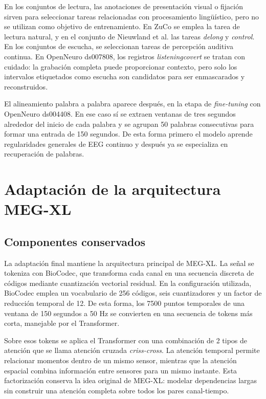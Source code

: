 En los conjuntos de lectura, las anotaciones de presentación visual o fijación sirven para seleccionar tareas relacionadas con procesamiento lingüístico, pero no se utilizan como objetivo de entrenamiento. En ZuCo se emplea la tarea de lectura natural, y en el conjunto de Nieuwland et al. las tareas \textit{delong} y \textit{control}. En los conjuntos de escucha, se seleccionan tareas de percepción auditiva continua. En OpenNeuro ds007808, los registros \textit{listeningcovert} se tratan con cuidado: la grabación completa puede proporcionar contexto, pero solo los intervalos etiquetados como escucha son candidatos para ser enmascarados y reconstruidos.

El alineamiento palabra a palabra aparece después, en la etapa de \textit{fine-tuning} con OpenNeuro ds004408. En ese caso sí se extraen ventanas de tres segundos alrededor del inicio de cada palabra y se agrupan 50 palabras consecutivas para formar una entrada de 150 segundos. De esta forma primero el modelo aprende regularidades generales de EEG continuo y después ya se especializa en recuperación de palabras.

\section{Adaptación de la arquitectura MEG-XL}

\subsection{Componentes conservados}

La adaptación final mantiene la arquitectura principal de MEG-XL. La señal se tokeniza con BioCodec, que transforma cada canal en una secuencia discreta de códigos mediante cuantización vectorial residual. En la configuración utilizada, BioCodec emplea un vocabulario de 256 códigos, seis cuantizadores y un factor de reducción temporal de 12. De esta forma, los 7500 puntos temporales de una ventana de 150 segundos a 50 Hz se convierten en una secuencia de tokens más corta, manejable por el Transformer.

Sobre esos tokens se aplica el Transformer con una combinación de 2 tipos de atención que se llama atención cruzada \textit{criss-cross}. La atención temporal permite relacionar momentos dentro de un mismo sensor, mientras que la atención espacial combina información entre sensores para un mismo instante. Esta factorización conserva la idea original de MEG-XL: modelar dependencias largas sin construir una atención completa sobre todos los pares canal-tiempo.

